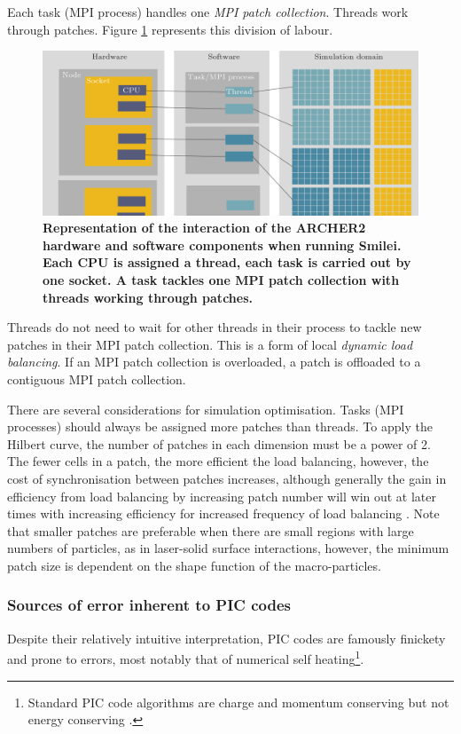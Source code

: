 Each task (MPI process) handles one \textit{MPI patch collection}. Threads work through patches. Figure \ref{fig:introsmileiparallelisationcomplex} represents this division of labour.
\begin{figure}
	\centering
	\includegraphics[width=1\linewidth]{figures/intro/intro_smilei_parallelisation_complex}
	\caption[Representation of the interaction of the ARCHER2 hardware and software components when running Smilei.]{\textbf{Representation of the interaction of the ARCHER2 hardware and software components when running Smilei. Each CPU is assigned a thread, each task is carried out by one socket. A task tackles one MPI patch collection with threads working through patches.}}
		\label{fig:introsmileiparallelisationcomplex}
\end{figure}
Threads do not need to wait for other threads in their process to tackle new patches in their MPI patch collection. This is a form of local \textit{dynamic load balancing}. If an MPI patch collection is overloaded, a patch is offloaded to a contiguous MPI patch collection.

There are several considerations for simulation optimisation. Tasks (MPI processes) should always be assigned more patches than threads. To apply the Hilbert curve, the number of patches in each dimension must be a power of 2. The fewer cells in a patch, the more efficient the load balancing, however, the cost of synchronisation between patches increases, although generally the gain in efficiency from load balancing by increasing patch number will win out at later times with increasing efficiency for increased frequency of load balancing \cite{derouillatSmileiCollaborativeOpensource2018}. Note that smaller patches are preferable when there are small regions with large numbers of particles, as in laser-solid surface interactions, however, the minimum patch size is dependent on the shape function of the macro-particles.

\subsubsection{Sources of error inherent to PIC codes}
Despite their relatively intuitive interpretation, PIC codes are famously finickety and prone to errors, most notably that of numerical self heating\footnote{Standard PIC code algorithms are charge and momentum conserving but not energy conserving \cite{derouillatSmileiCollaborativeOpensource2018}.}.

